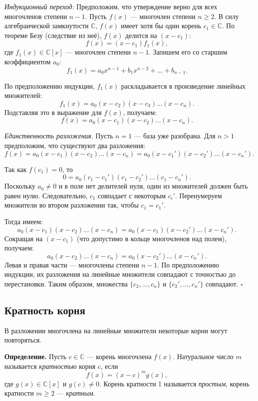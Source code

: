 \documentclass[a4paper,12pt]{article}
\theoremstyle{definition}
\theoremstyle{plain}
\theoremstyle{remark}
\begin{document}
	\textit{Индукционный переход:} Предположим, что утверждение верно для всех многочленов степени \( n-1 \). Пусть \( f(x) \) — многочлен степени \( n \geq 2 \). В силу алгебраической замкнутости \( \mathbb{C} \), \( f(x) \) имеет хотя бы один корень \( c_1 \in \mathbb{C} \). По теореме Безу (следствие из неё), \( f(x) \) делится на \( (x - c_1) \):
	\[
	f(x) = (x - c_1) f_1(x),
	\]
	где \( f_1(x) \in \mathbb{C}[x] \) — многочлен степени \( n-1 \). Запишем его со старшим коэффициентом \( a_0 \):
	\[
	f_1(x) = a_0 x^{n-1} + b_1 x^{n-2} + \dots + b_{n-1}.
	\]
	
	По предположению индукции, \( f_1(x) \) раскладывается в произведение линейных множителей:
	\[
	f_1(x) = a_0 (x - c_2)(x - c_3) \dots (x - c_n).
	\]
	Подставляя это в выражение для \( f(x) \), получаем:
	\[
	f(x) = a_0 (x - c_1)(x - c_2) \dots (x - c_n).
	\]
	
	\textit{Единственность разложения.}
	Пусть \( n = 1 \) — база уже разобрана. Для \( n > 1 \) предположим, что существуют два разложения:
	\[
	f(x) = a_0 (x - c_1)(x - c_2) \dots (x - c_n) = a_0 (x - c_1')(x - c_2') \dots (x - c_n').
	\]
	
	Так как \( f(c_1) = 0 \), то
	\[
	0 = a_0 (c_1 - c_1')(c_1 - c_2') \dots (c_1 - c_n').
	\]
	Поскольку \( a_0 \neq 0 \) и в поле нет делителей нуля, один из множителей должен быть равен нулю. Следовательно, \( c_1 \) совпадает с некоторым \( c_i' \). Перенумеруем множители во втором разложении так, чтобы \( c_1 = c_1' \).
	
	Тогда имеем:
	\[
	a_0 (x - c_1)(x - c_2) \dots (x - c_n) = a_0 (x - c_1)(x - c_2') \dots (x - c_n').
	\]
	Сокращая на \( (x - c_1) \) (что допустимо в кольце многочленов над полем), получаем:
	\[
	a_0 (x - c_2) \dots (x - c_n) = a_0 (x - c_2') \dots (x - c_n').
	\]
	Левая и правая части — многочлены степени \( n-1 \). По предположению индукции, их разложения на линейные множители совпадают с точностью до перестановки. Таким образом, множества \( \{c_2, \dots, c_n\} \) и \( \{c_2', \dots, c_n'\} \) совпадают. \hfill \(\square\)
	
	\subsection{Кратность корня}
	
	В разложении многочлена на линейные множители некоторые корни могут повторяться.
	
	\medskip
	\noindent \textbf{Определение.} Пусть \( c \in \mathbb{C} \) — корень многочлена \( f(x) \). Натуральное число \( m \) называется \textit{кратностью} корня \( c \), если
	\[
	f(x) = (x - c)^m g(x),
	\]
	где \( g(x) \in \mathbb{C}[x] \) и \( g(c) \neq 0 \). Корень кратности 1 называется \textit{простым}, корень кратности \( m \geq 2 \) — \textit{кратным}.
	
\end{document}
